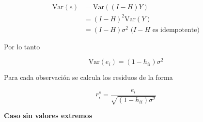 \documentclass[
  12pt,
]{book}
\newenvironment{Shaded}{\begin{snugshade}}{\end{snugshade}}
\newcommand{\DataTypeTok}[1]{\textcolor[rgb]{0.13,0.29,0.53}{#1}}
\newcommand{\DecValTok}[1]{\textcolor[rgb]{0.00,0.00,0.81}{#1}}
\newcommand{\FloatTok}[1]{\textcolor[rgb]{0.00,0.00,0.81}{#1}}
\newcommand{\KeywordTok}[1]{\textcolor[rgb]{0.13,0.29,0.53}{\textbf{#1}}}
\newcommand{\NormalTok}[1]{#1}
\newcommand{\OperatorTok}[1]{\textcolor[rgb]{0.81,0.36,0.00}{\textbf{#1}}}
\newcommand{\StringTok}[1]{\textcolor[rgb]{0.31,0.60,0.02}{#1}}
\theoremstyle{definition}
\theoremstyle{definition}
\theoremstyle{definition}
\theoremstyle{remark}
\begin{document}
\begin{align*}
\mathrm{Var}\left(e\right) 
&=  \mathrm{Var}\left((I-H)Y\right)\\
&= (I-H)^{2}\mathrm{Var}\left(Y\right)\\
&= (I-H) \sigma^{2} \text{ (\(I-H\) es idempotente)}
\end{align*}

Por lo tanto

\begin{equation*}
\mathrm{Var}\left(e_{i}\right) = (1-h_{ii}) \sigma^{2}
\end{equation*}

Para cada observación se calcula los residuos de la forma

\begin{equation*}
r_{i}^{s} = \frac{e_i}{\sqrt{(1-h_{ii}) \sigma^{2}}}
\end{equation*}

\textbf{Caso sin valores extremos}

\begin{Shaded}
\end{Shaded}
\end{document}
